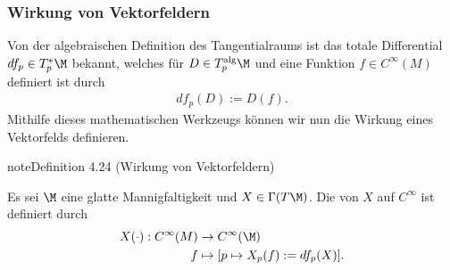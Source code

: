 \documentclass[letterpaper,10pt,german]{jupyterBook}
\begin{document}
\subsubsection{Wirkung von Vektorfeldern}
\label{\detokenize{manifolds/tangential:wirkung-von-vektorfeldern}}
\sphinxAtStartPar
Von der algebraischen Definition des Tangentialraums ist das totale Differential \(df_p\in T^\ast_p\M\) bekannt, welches für \(D\in T^{\text{alg}}_p\M\) und eine Funktion \(f\in C^\infty(M)\) definiert ist durch
\begin{equation*}
\begin{split}df_p(D):= D(f).\end{split}
\end{equation*}
\sphinxAtStartPar
Mithilfe dieses mathematischen Werkzeugs können wir nun die Wirkung eines Vektorfelds definieren.
\label{manifolds/tangential:def:wirkung}
\begin{sphinxadmonition}{note}{Definition 4.24 (Wirkung von Vektorfeldern)}



\sphinxAtStartPar
Es sei \(\M\) eine glatte Mannigfaltigkeit und \(X\in\Gamma(T\M)\).
Die  von \(X\) auf \(C^\infty\) ist definiert durch
\begin{equation*}
\begin{split}X(\cdot):C^\infty(M) &\to C^\infty(\M)\\
f &\mapsto [p\mapsto X_p(f) := df_p(X)].\end{split}
\end{equation*}\end{sphinxadmonition}
\end{document}
